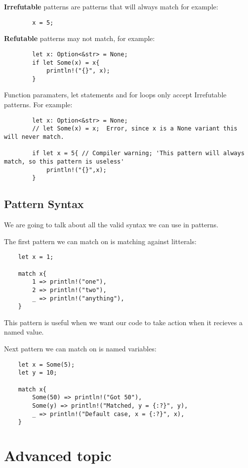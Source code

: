 \begin{definition}
    \textbf{Irrefutable} patterns are patterns that will always match for example:\begin{lstlisting}
        x = 5;
    \end{lstlisting}

    \textbf{Refutable} patterns may not match, for example:\begin{lstlisting}
        let x: Option<&str> = None;
        if let Some(x) = x{
            println!("{}", x);
        }
    \end{lstlisting}
    Function paramaters, let statements and for loops only accept Irrefutable patterns. For example:\begin{lstlisting}
        let x: Option<&str> = None;
        // let Some(x) = x;  Error, since x is a None variant this will never match.
        
        if let x = 5{ // Compiler warning; 'This pattern will always match, so this pattern is useless'
            println!("{}",x);
        }
    \end{lstlisting}
\end{definition}

\subsection{Pattern Syntax}

We are going to talk about all the valid syntax we can use in patterns.

The first pattern we can match on is matching against litterals:\begin{lstlisting}
    let x = 1;
    
    match x{
        1 => println!("one"),
        2 => println!("two"),
        _ => println!("anything"),
    }
\end{lstlisting}
This pattern is useful when we want our code to take action when it recieves a named value.

Next pattern we can match on is named variables:\begin{lstlisting}
    let x = Some(5);
    let y = 10;

    match x{
        Some(50) => println!("Got 50"),
        Some(y) => println!("Matched, y = {:?}", y),
        _ => println!("Default case, x = {:?}", x),
    }
\end{lstlisting}

\section{Advanced topic}
